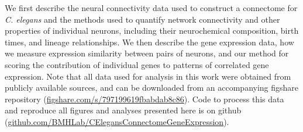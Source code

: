 \documentclass[10pt,letterpaper]{article}
\begin{document}
We first describe the neural connectivity data used to construct a connectome for \textit{C. elegans} and the methods used to quantify network connectivity and other properties of individual neurons, including their neurochemical composition, birth times, and lineage relationships.
We then describe the gene expression data, how we measure expression similarity between pairs of neurons, and our method for scoring the contribution of individual genes to patterns of correlated gene expression.
Note that all data used for analysis in this work were obtained from publicly available sources, and can be downloaded from an accompanying figshare repository (\url{figshare.com/s/797199619fbabdab8c86}).
Code to process this data and reproduce all figures and analyses presented here is on github (\url{github.com/BMHLab/CElegansConnectomeGeneExpression}).



\end{document}
